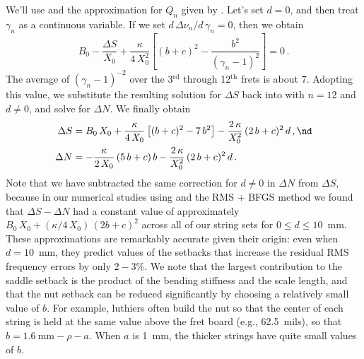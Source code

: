 We'll use  and the approximation for $Q_n$ given by . Let's set $d = 0$, and then treat $\gamma_n$ as a continuous variable. If we set $d\, \Delta \nu_n / d\, \gamma_n = 0$, then we obtain
\begin{equation}
  B_0 - \frac{\Delta S}{X_0} + \frac{\kappa}{4\, X_0^2} \left[ (b + c)^2 - \frac{b^2}{(\gamma_n - 1)^2} \right] = 0\, .
\end{equation}
The average of $(\gamma_n - 1)^{-2}$ over the 3$^\textrm{rd}$ through 12$^\textrm{th}$ frets is about $7$. Adopting this value, we substitute the resulting solution for $\Delta S$ back into  with $n = 12$ and $d \ne 0$, and solve for $\Delta N$. We finally obtain
\begin{subequations} \label{eqn:comp_approx}
  \begin{align}
    \label{eqn:comp_approx_ds} \Delta S &= B_0\, X_0 + \frac{\kappa}{4\, X_0} \left[(b + c)^2 - 7\, b^2\right] - \frac{2\, \kappa}{X_0^2}\, (2\, b + c)^2\, d\, , \nd \\
    \label{eqn:comp_approx_dn} \Delta N &= -\frac{\kappa}{2\, X_0}\, (5\, b + c)\, b - \frac{2\, \kappa}{X_0^2}\, (2\, b + c)^2\, d\, .
  \end{align}
\end{subequations}
Note that we have subtracted the same correction for $d \ne 0$ in $\Delta N$ from $\Delta S$, because in our numerical studies using  and the RMS + BFGS method we found that $\Delta S - \Delta N$ had a constant value of approximately $B_0\, X_0 + (\kappa/4\, X_0)\, (2 b + c)^2$ across all of our string sets for $0 \le d \le 10$~mm. These approximations are remarkably accurate given their origin: even when $d = 10$~mm, they predict values of the setbacks that increase the residual RMS frequency errors by only $2 - 3$\%. We note that the largest contribution to the saddle setback is the product of the bending stiffness and the scale length, and that the nut setback can be reduced significantly by choosing a relatively small value of $b$. For example, luthiers often build the nut so that the center of each string is held at the same value above the fret board (e.g., 62.5~mils), so that $b = 1.6 \mathrm{~mm} - \rho - a$. When $a$ is 1~mm, the thicker strings have quite small values of $b$.


